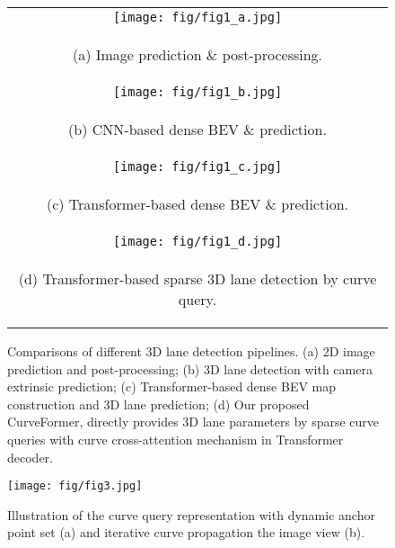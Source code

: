 \documentclass[letterpaper, 10 pt, conference]{ieeeconf}
\begin{document}
\begin{figure}[ht]
 \centering
  \begin{tabular}{c}
   \texttt{[image: fig/fig1\_a.jpg]}\\
   \begin{scriptsize}  
   (a) Image prediction \& post-processing. 
   \end{scriptsize} \\
   \texttt{[image: fig/fig1\_b.jpg]}\\
   \begin{scriptsize}  
   (b) CNN-based dense BEV \& prediction.
   \end{scriptsize}  \\
   \texttt{[image: fig/fig1\_c.jpg]}\\
   \begin{scriptsize}  
   (c) Transformer-based dense BEV \& prediction. 
   \end{scriptsize}  \\
   \texttt{[image: fig/fig1\_d.jpg]}\\
   \begin{scriptsize}  
   (d) Transformer-based sparse 3D lane detection by curve query.
   \end{scriptsize}  \\
 \end{tabular}
 \caption{Comparisons of different 3D lane detection pipelines. (a) 2D image prediction and post-processing; (b) 3D lane detection with camera extrinsic prediction; (c) Transformer-based dense BEV map construction and 3D lane prediction; (d) Our proposed CurveFormer, directly provides 3D lane parameters by sparse curve queries with curve cross-attention mechanism in Transformer decoder.} 
 \label{fig_compare_methods}
\end{figure}

\begin{figure}[ht]
	\centering
	\texttt{[image: fig/fig3.jpg]}
	\caption{Illustration of the curve query representation with dynamic anchor point set (a) and iterative curve propagation the image view (b).}
	\label{fig:representation}
\end{figure}
\end{document}
